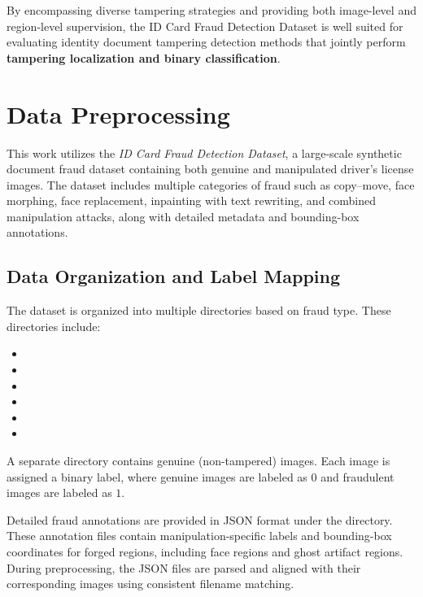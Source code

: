 \documentclass[12pt]{article}
\begin{document}
By encompassing diverse tampering strategies and providing both image-level and region-level supervision, the ID Card Fraud Detection Dataset is well suited for evaluating identity document tampering detection methods that jointly perform \textbf{tampering localization and binary classification}.

\section{Data Preprocessing}

This work utilizes the \textit{ ID Card Fraud Detection Dataset}, a large-scale synthetic document fraud dataset containing both genuine and manipulated driver's license images. The dataset includes multiple categories of fraud such as copy--move, face morphing, face replacement, inpainting with text rewriting, and combined manipulation attacks, along with detailed metadata and bounding-box annotations.

\subsection{Data Organization and Label Mapping}

The dataset is organized into multiple directories based on fraud type. These directories include:

\begin{itemize}
    \item {}
    \item {}
    \item {}
    \item {}
    \item {}
    \item {}
\end{itemize}

A separate  directory contains genuine (non-tampered) images. Each image is assigned a binary label, where genuine images are labeled as $0$ and fraudulent images are labeled as $1$.

Detailed fraud annotations are provided in JSON format under the  directory. These annotation files contain manipulation-specific labels and bounding-box coordinates for forged regions, including face regions and ghost artifact regions. During preprocessing, the JSON files are parsed and aligned with their corresponding images using consistent filename matching.
\end{document}
